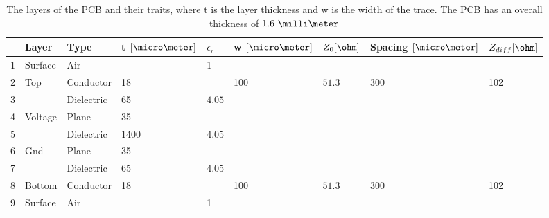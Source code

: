 \documentclass[main.tex]{subfiles}
\begin{document}
\begin{table} [h]
\begin{center}
    \begin{tabular}{| l | l | l | l | l | l | l | l | l |}
    \hline
     & Layer & Type & t $[\micro\meter]$ & $\epsilon_r$ & w $[\micro\meter]$  & $Z_0 [\ohm]$ & Spacing $[\micro\meter]$  & $Z_{diff} [\ohm]$ \\ 
     \hline
    1 	  & Surface & Air 		 & 		& 1 	 & 	   & 					& 	  & \\ \hline
    2 	  & Top 	& Conductor  & 18 	&        & 100 & $51.3$             & 300 & 102\\ \hline
    3 	  &  		& Dielectric & 65 	& $4.05$ & 	   & 					& 	  & \\ \hline
    4 	  & Voltage & Plane 	 & 35 	&        & 	   & 					& 	  & \\ \hline
    5 	  &  		& Dielectric & 1400 & $4.05$ & 	   &					&	  & \\ \hline
    6 	  & Gnd 	& Plane 	 & 35 	&        & 	   & 					& 	  & \\ \hline
    7 	  &  		& Dielectric & 65 	& $4.05$ &     & 					& 	  & \\ \hline
    8 	  & Bottom 	& Conductor  & 18 	&        & 100 & $51.3$             & 300 & 102\\ \hline
    9 	  & Surface & Air 		 & 	  	& 1 	 & 	   & 					& 	  & \\ \hline
    \end{tabular}
     \caption{The layers of the PCB and their traits, where t is the layer thickness and w is the width of the trace. The PCB has an overall thickness of $1.6\ \milli\meter$}
	\label{tab:Xsect1}
\end{center}
\end{table}
\end{document}
